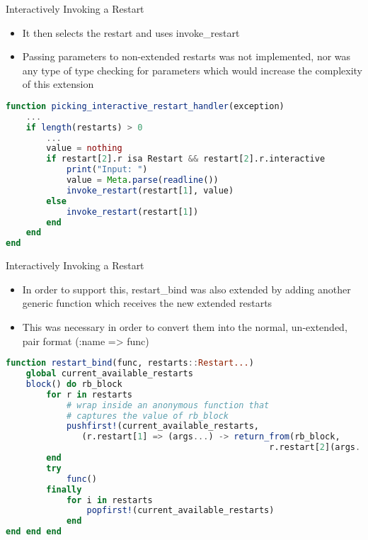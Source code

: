 \documentclass{beamer}
\begin{document}
\begin{frame}[fragile,t]{Interactively Invoking a Restart}

\begin{itemize}
    \item It then selects the restart and uses invoke\_restart
    \item Passing parameters to non-extended restarts was not implemented, nor was any type of type checking for parameters which would increase the complexity of this extension
\end{itemize}
\vfill

\begin{lstlisting}[language=julia, style=jlcodestyle,]
function picking_interactive_restart_handler(exception)
    ...
    if length(restarts) > 0
        ...
        value = nothing
        if restart[2].r isa Restart && restart[2].r.interactive
            print("Input: ")
            value = Meta.parse(readline())
            invoke_restart(restart[1], value)
        else
            invoke_restart(restart[1])
        end
    end
end
\end{lstlisting}
\end{frame}

\begin{frame}[fragile,t]{Interactively Invoking a Restart}

\begin{itemize}
    \item In order to support this, restart\_bind was also extended by adding another generic function which receives the new extended restarts
    \item This was necessary in order to convert them into the normal, un-extended, pair format (:name => func)
\end{itemize}
\vfill

\begin{lstlisting}[language=julia, style=jlcodestyle,]
function restart_bind(func, restarts::Restart...)
    global current_available_restarts
    block() do rb_block
        for r in restarts
            # wrap inside an anonymous function that
            # captures the value of rb_block
            pushfirst!(current_available_restarts,
               (r.restart[1] => (args...) -> return_from(rb_block,
                                                    r.restart[2](args...))))
        end
        try
            func()
        finally
            for i in restarts
                popfirst!(current_available_restarts)
            end
end end end
\end{lstlisting}
\end{frame}
\end{document}
